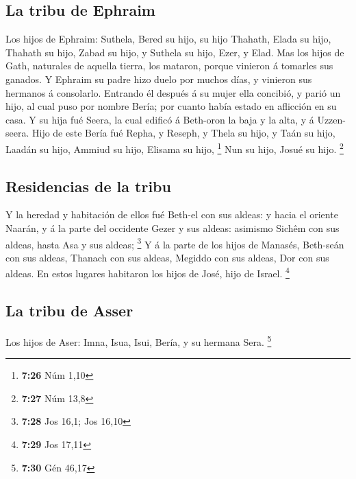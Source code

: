 \hypertarget{la-tribu-de-ephraim}{%
\subsection{La tribu de Ephraim}\label{la-tribu-de-ephraim}}

 Los hijos de Ephraim: Suthela, Bered su hijo, su hijo
Thahath, Elada su hijo, Thahath su hijo,  Zabad su hijo, y
Suthela su hijo, Ezer, y Elad. Mas los hijos de Gath, naturales de
aquella tierra, los mataron, porque vinieron á tomarles sus ganados.
 Y Ephraim su padre hizo duelo por muchos días, y vinieron
sus hermanos á consolarlo.  Entrando él después á su mujer
ella concibió, y parió un hijo, al cual puso por nombre Bería; por
cuanto había estado en aflicción en su casa.  Y su hija fué
Seera, la cual edificó á Beth-oron la baja y la alta, y á Uzzen-seera.
 Hijo de este Bería fué Repha, y Reseph, y Thela su hijo, y
Taán su hijo,  Laadán su hijo, Ammiud su hijo, Elisama su
hijo, \footnote{\textbf{7:26} Núm 1,10}  Nun su hijo, Josué
su hijo. \footnote{\textbf{7:27} Núm 13,8}

\hypertarget{residencias-de-la-tribu}{%
\subsection{Residencias de la tribu}\label{residencias-de-la-tribu}}

 Y la heredad y habitación de ellos fué Beth-el con sus
aldeas: y hacia el oriente Naarán, y á la parte del occidente Gezer y
sus aldeas: asimismo Sichêm con sus aldeas, hasta Asa y sus aldeas;
\footnote{\textbf{7:28} Jos 16,1; Jos 16,10}  Y á la parte
de los hijos de Manasés, Beth-seán con sus aldeas, Thanach con sus
aldeas, Megiddo con sus aldeas, Dor con sus aldeas. En estos lugares
habitaron los hijos de José, hijo de Israel. \footnote{\textbf{7:29} Jos
  17,11}

\hypertarget{la-tribu-de-asser}{%
\subsection{La tribu de Asser}\label{la-tribu-de-asser}}

 Los hijos de Aser: Imna, Isua, Isui, Bería, y su hermana
Sera. \footnote{\textbf{7:30} Gén 46,17}

